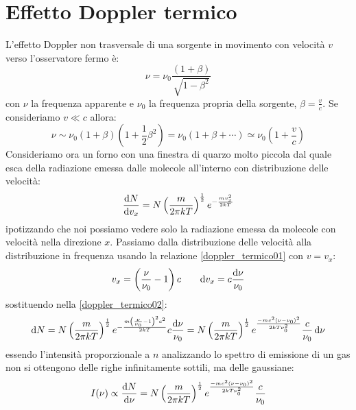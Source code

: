 \section{Effetto Doppler termico}
L'effetto Doppler non trasversale di una sorgente in movimento con velocità $v$ verso l'osservatore fermo è:
\begin{equation}
	\nu=\nu_0\frac{(1+\beta)}{\sqrt{1-\beta^2}}
\end{equation}
con $\nu$ la frequenza apparente e $\nu_0$ la frequenza propria della sorgente, $\beta=\frac{v}{c}$. Se consideriamo $v\ll c$ allora:
\begin{equation}
	\nu\sim \nu_0(1+\beta)\left(1+\frac{1}{2}\beta^2\right)=\nu_0\left(1+\beta+\cdots\right)\simeq \nu_0\left(1 + \frac{v}{c}\right)
		\label{doppler_termico01}
\end{equation}
Consideriamo ora un forno con una finestra di quarzo molto piccola dal quale esca della radiazione emessa dalle molecole all'interno con distribuzione delle velocità:
\begin{equation}
	\frac{\mathrm{d} N}{\mathrm{d} v_x}=N\left(\frac{m}{2\pi kT}\right)^{\frac{1}{2}}e^{-\frac{mv_x^2}{2kT}}
	\label{doppler_termico02}
\end{equation}
ipotizzando che noi possiamo vedere solo la radiazione emessa da molecole con velocità nella direzione $x$. Passiamo dalla distribuzione delle velocità alla distribuzione in frequenza usando la relazione \eqref{doppler_termico01} con $v=v_x$:
\begin{equation}
	v_x=\left(\frac{\nu}{\nu_0}-1\right)c\qquad \mathrm{d} v_x=c\frac{\mathrm{d} \nu}{\nu_0}
\end{equation}
sostituendo nella \eqref{doppler_termico02}:
\begin{equation}
	\mathrm{d} N=N\left(\frac{m}{2\pi kT}\right)^{\frac{1}{2}}e^{-\frac{m\left(\frac{\nu}{\nu_0}-1\right)^2 c^2}{2kT}}c\frac{\mathrm{d} \nu}{\nu_0}=N\left(\frac{m}{2\pi kT}\right)^{\frac{1}{2}}e^{\frac{-mc^2\left(\nu-\nu_0\right)^2}{2kT\nu_0^2}}\frac{c}{\nu_0}\,\mathrm{d}\nu
\end{equation}
essendo l'intensità proporzionale a $n$ analizzando lo spettro di emissione di un gas non si ottengono delle righe infinitamente sottili, ma delle gaussiane:
\begin{equation}
	I(\nu)\propto \frac{\mathrm{d} N}{\mathrm{d} \nu}=N\left(\frac{m}{2\pi kT}\right)^{\frac{1}{2}}e^{\frac{-mc^2\left(\nu-\nu_0\right)^2}{2kT\nu_0^2}}\frac{c}{\nu_0}
\end{equation}
